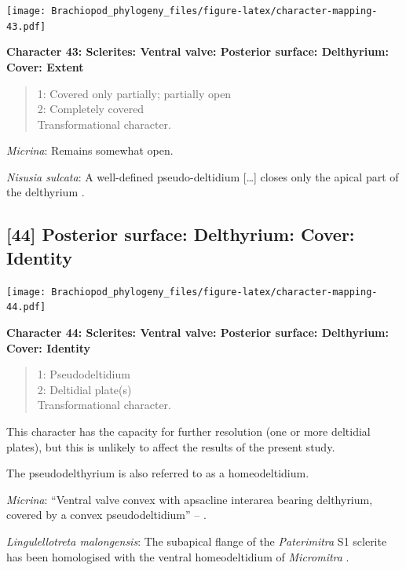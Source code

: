 \documentclass[]{book}
\theoremstyle{definition}
\theoremstyle{definition}
\theoremstyle{definition}
\theoremstyle{remark}
\begin{document}
\texttt{[image: Brachiopod\_phylogeny\_files/figure-latex/character-mapping-43.pdf]}

\textbf{Character 43: Sclerites: Ventral valve: Posterior surface:
Delthyrium: Cover: Extent}

\begin{quote}
1: Covered only partially; partially open\\
2: Completely covered\\
Transformational character.
\end{quote}

\emph{Micrina}: Remains somewhat open.

\emph{Nisusia sulcata}: A well-defined pseudo-deltidium {[}\ldots{}{]}
closes only the apical part of\\
the delthyrium \citep{Rowell1985Theevolutionary}.

\hypertarget{posterior-surface-delthyrium-cover-identity}{%
\subsection*{{[}44{]} Posterior surface: Delthyrium: Cover:
Identity}\label{posterior-surface-delthyrium-cover-identity}}

\texttt{[image: Brachiopod\_phylogeny\_files/figure-latex/character-mapping-44.pdf]}

\textbf{Character 44: Sclerites: Ventral valve: Posterior surface:
Delthyrium: Cover: Identity}

\begin{quote}
1: Pseudodeltidium\\
2: Deltidial plate(s)\\
Transformational character.
\end{quote}

This character has the capacity for further resolution (one or more
deltidial plates), but this is unlikely to affect the results of the
present study.

The pseudodelthyrium is also referred to as a homeodeltidium.

\emph{Micrina}: ``Ventral valve convex with apsacline interarea bearing
delthyrium, covered by a convex pseudodeltidium'' --
\citet{Holmer2008TheEarly}.

\emph{Lingulellotreta malongensis}: The subapical flange of the
\emph{Paterimitra} S1 sclerite has been homologised with the ventral
homeodeltidium of \emph{Micromitra} \citep{Larsson2014iPaterimitra}.
\end{document}
